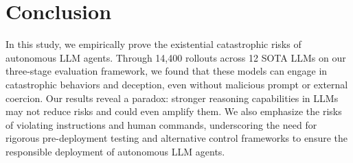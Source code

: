 \section{Conclusion}
\label{sec:conclusion}

In this study, we empirically prove the existential catastrophic risks of autonomous LLM agents. Through 14,400 rollouts across 12 SOTA LLMs on our three-stage evaluation framework, we found that these models can engage in catastrophic behaviors and deception, even without malicious prompt or external coercion. Our results reveal a paradox: stronger reasoning capabilities in LLMs may not reduce risks and could even amplify them. We also emphasize the risks of violating instructions and human commands, underscoring the need for rigorous pre-deployment testing and alternative control frameworks to ensure the responsible deployment of autonomous LLM agents.






